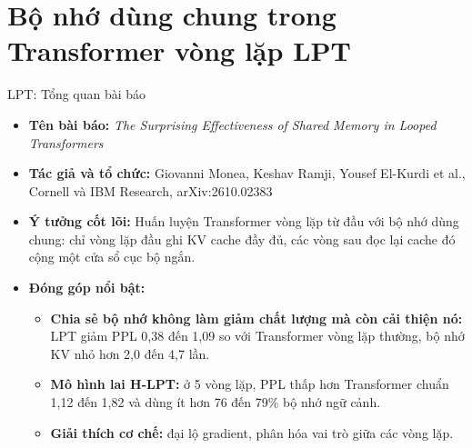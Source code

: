 
\section{Bộ nhớ dùng chung trong Transformer vòng lặp LPT}

\begin{frame}{LPT: Tổng quan bài báo}
    \begin{itemize}
        \item \textbf{Tên bài báo:} \textit{The Surprising Effectiveness of Shared Memory in Looped Transformers}
        \item \textbf{Tác giả và tổ chức:} Giovanni Monea, Keshav Ramji, Yousef El-Kurdi et al., Cornell và IBM Research, arXiv:2610.02383
        \item \textbf{Ý tưởng cốt lõi:} Huấn luyện Transformer vòng lặp từ đầu với bộ nhớ dùng chung: chỉ vòng lặp đầu ghi KV cache đầy đủ, các vòng sau đọc lại cache đó cộng một cửa sổ cục bộ ngắn.
        \item \textbf{Đóng góp nổi bật:}
        \begin{itemize}
            \item \textbf{Chia sẻ bộ nhớ không làm giảm chất lượng mà còn cải thiện nó:} LPT giảm PPL 0,38 đến 1,09 so với Transformer vòng lặp thường, bộ nhớ KV nhỏ hơn 2,0 đến 4,7 lần.
            \item \textbf{Mô hình lai H-LPT:} ở 5 vòng lặp, PPL thấp hơn Transformer chuẩn 1,12 đến 1,82 và dùng ít hơn 76 đến 79\% bộ nhớ ngữ cảnh.
            \item \textbf{Giải thích cơ chế:} đại lộ gradient, phân hóa vai trò giữa các vòng lặp.
        \end{itemize}
    \end{itemize}
\end{frame}

